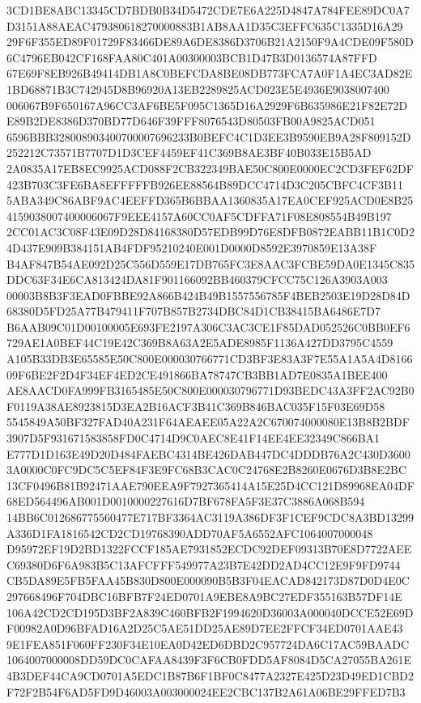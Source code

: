 \documentclass[UTF8,fontset=fandol,zihao=-4,a4paper]{ctexart}
\begin{document}
{{3CD1BE8ABC13345CD7BDB0B34D5472CDE7E6A225D4847A784FEE89DC0A7D3151A88AEAC479380618270000883B1AB8AA1D35C3EFFC635C1335D16A29
29F6F355ED89F01729F83466DE89A6DE8386D3706B21A2150F9A4CDE09F580D6C4796EB042CF168FAA80C401A00300003BCB1D47B3D0136574A87FFD
67E69F8EB926B49414DB1A8C0BEFCDA8BE08DB773FCA7A0F1A4EC3AD82E1BD68871B3C742945D8B96920A13EB2289825ACD023E5E4936E9038007400
006067B9F650167A96CC3AF6BE5F095C1365D16A2929F6B635986E21F82E72DE89B2DE8386D370BD77D646F39FFF8076543D80503FB00A9825ACD051
6596BBB328008903400700007696233B0BEFC4C1D3EE3B9590EB9A28F809152D252212C73571B7707D1D3CEF4459EF41C369B8AE3BF40B033E15B5AD
2A0835A17EB8EC9925ACD088F2CB322349BAE50C800E0000EC2CD3FEF62DF423B703C3FE6BA8EFFFFFB926EE88564B89DCC4714D3C205CBFC4CF3B11
5ABA349C86ABF9AC4EEFFD365B6BBAA1360835A17EA0CEF925ACD0E8B254159038007400006067F9EEE4157A60CC0AF5CDFFA71F08E808554B49B197
2CC01AC3C08F43E09D28D84168380D57EDB99D76E8DFB0872EABB11B1C0D24D437E909B384151AB4FDF95210240E001D0000D8592E3970859E13A38F
B4AF847B54AE092D25C556D559E17DB765FC3E8AAC3FCBE59DA0E1345C835DDC63F34E6CA813424DA81F901166092BB460379CFCC75C126A3903A003
00003B8B3F3EAD0FBBE92A866B424B49B1557556785F4BEB2503E19D28D84D68380D5FD25A77B479411F707B857B2734DBC84D1CB38415BA6486E7D7
B6AAB09C01D00100005E693FE2197A306C3AC3CE1F85DAD052526C0BB0EF6729AE1A0BEF44C19E42C369B8A63A2E5ADE8985F1136A427DD3795C4559
A105B33DB3E65585E50C800E000030766771CD3BF3E83A3F7E55A1A5A4D816609F6BE2F2D4F34EF4ED2CE491866BA78747CB3BB1AD7E0835A1BEE400
AE8AACD0FA999FB3165485E50C800E000030796771D93BEDC43A3FF2AC92B0F0119A38AE8923815D3EA2B16ACF3B41C369B846BAC035F15F03E69D58
5545849A50BF327FAD40A231F64AEAEE05A22A2C670074000080E13B8B2BDF3907D5F931671583858FD0C4714D9C0AEC8E41F14EE4EE32349C866BA1
E777D1D163E49D20D484FAEBC4314BE426DAB447DC4DDDB76A2C430D36003A0000C0FC9DC5C5EF84F3E9FC68B3CAC0C24768E2B8260E0676D3B8E2BC
13CF0496B81B92471AAE790EEA9F7927365414A15E25D4CC121D89968EA04DF68ED564496AB001D0010000227616D7BF678FA5F3E37C3886A068B594
14BB6C012686775560477E717BF3364AC3119A386DF3F1CEF9CDC8A3BD13299A336D1FA1816542CD2CD19768390ADD70AF5A6552AFC1064007000048
D95972EF19D2BD1322FCCF185AE7931852ECDC92DEF09313B70E8D7722AEEC69380D6F6A983B5C13AFCFFF549977A23B7E42DD2AD4CC12E9F9FD9744
CB5DA89E5FB5FAA45B830D800E000090B5B3F04EACAD842173D87D0D4E0C297668496F704DBC16BFB7F24ED0701A9EBE8A9BC27EDF355163B57DF14E
106A42CD2CD195D3BF2A839C460BFB2F1994620D36003A000040DCCE52E69DF00982A0D96BFAD16A2D25C5AE51DD25AE89D7EE2FFCF34ED0701AAE43
9E1FEA851F060FF230F34E10EA0D42ED6DBD2C957724DA6C17AC59BAADC1064007000008DD59DC0CAFAA8439F3F6CB0FDD5AF8084D5CA27055BA261E
4B3DEF44CA9CD0701A5EDC1B87B6F1BF0C8477A2327E425D23D49ED1CBD2F72F2B54F6AD5FD9D46003A003000024EE2CBC137B2A61A06BE29FFED7B3
}}
\end{document}
